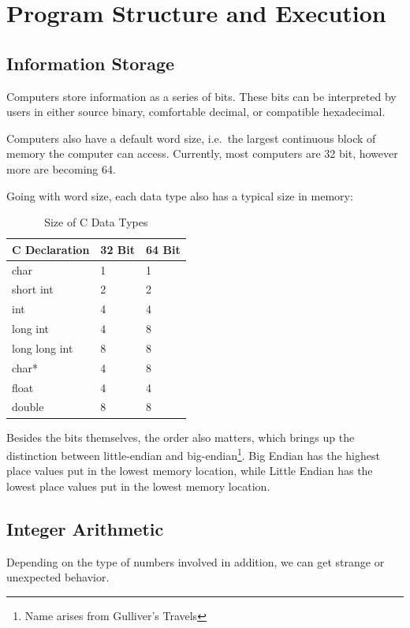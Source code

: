 \section{Program Structure and Execution}
    \subsection{Information Storage}
    Computers store information as a series of bits. These bits can be interpreted by users in either source binary, comfortable decimal, or compatible hexadecimal.

    Computers also have a default word size, i.e.\ the largest continuous block of memory the computer can access. Currently, most computers are 32 bit, however more are becoming 64.

    Going with word size, each data type also has a typical size in memory:

    \begin{table}[ht]
        \centering
        \begin{tabular}{l l l}
            {\ttfamily C} Declaration & 32 Bit & 64 Bit\\
            \hline
            char & 1 & 1\\
            short int & 2 & 2\\
            int & 4 & 4\\
            long int & 4 & 8\\
            long long int & 8 & 8\\
            char* & 4 & 8\\
            float & 4 & 4\\
            double & 8 & 8\\
        \end{tabular}
        \label{table:datatypesizes}
        \caption{Size of {\ttfamily C} Data Types}
    \end{table}

    Besides the bits themselves, the order also matters, which brings up the distinction between little-endian and big-endian\footnote{Name arises from Gulliver's Travels}. Big Endian has the highest place values put in the lowest memory location, while Little Endian has the lowest place values put in the lowest memory location.

    \subsection{Integer Arithmetic}
    Depending on the type of numbers involved in addition, we can get strange or unexpected behavior.

